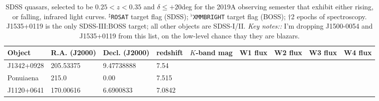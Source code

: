 \begin{table}
  \begin{tabular}{l  ll ll c c r}
    \hline \hline
    Object           &      R.A. (J2000) & Decl. (J2000)        & redshift & $K$-band mag & W1 flux & W2 flux & W3 flux & W4 flux                                              \\
    \hline
    J1342+0928  &	205.53375    & 9.47738888         &	7.54	     &	                & & & & 	 		    		  \\
    Ponuiaena	  &     215.0	    & 	0.00		    & 7.515    &  	                & & & & 	 		    		  \\	 	
    J1120+0641  & 	170.00616   &	6.6900833         &	7.0842	  &  	                & & & & 	 \\
                                                   \hline       
                                                    \hline
\end{tabular}
\caption{SDSS quasars, selected to be $0.25<z<0.35$ and $\delta \leq +20$deg for the 2019A 
observing semester that exhibit either rising, or falling, infrared light curves. 
$^{\sharp}${\tt ROSAT} target flag (SDSS); $^{\flat}${\tt XMMBRIGHT} target flag (BOSS); 
$\dagger$2 epochs of spectroscopy. 
J1535+0119 is the only SDSS-III:BOSS target; all other objects are SDSS-I/II. 
{\it Key notes::} I'm dropping J1500-0054 and J1535+0119 from this list, on 
the low-level chance thay they are blazars. 
}
     \label{tab:previous_surveys}
\end{table}
\normalsize


%

